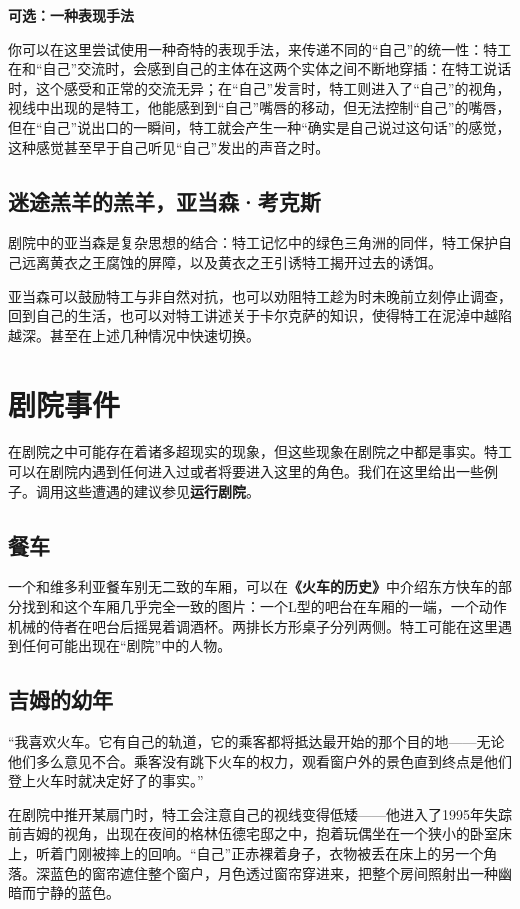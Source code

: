 \textbf{可选：一种表现手法}

你可以在这里尝试使用一种奇特的表现手法，来传递不同的“自己”的统一性：特工在和“自己”交流时，会感到自己的主体在这两个实体之间不断地穿插：在特工说话时，这个感受和正常的交流无异；在“自己”发言时，特工则进入了“自己”的视角，视线中出现的是特工，他能感到到“自己”嘴唇的移动，但无法控制“自己”的嘴唇，但在“自己”说出口的一瞬间，特工就会产生一种“确实是自己说过这句话”的感觉，这种感觉甚至早于自己听见“自己”发出的声音之时。

\subsection{迷途羔羊的羔羊，亚当森·考克斯}

剧院中的亚当森是复杂思想的结合：特工记忆中的绿色三角洲的同伴，特工保护自己远离黄衣之王腐蚀的屏障，以及黄衣之王引诱特工揭开过去的诱饵。

亚当森可以鼓励特工与非自然对抗，也可以劝阻特工趁为时未晚前立刻停止调查，回到自己的生活，也可以对特工讲述关于卡尔克萨的知识，使得特工在泥淖中越陷越深。甚至在上述几种情况中快速切换。

\section{剧院事件}
在剧院之中可能存在着诸多超现实的现象，但这些现象在剧院之中都是事实。特工可以在剧院内遇到任何进入过或者将要进入这里的角色。我们在这里给出一些例子。调用这些遭遇的建议参见\textbf{运行剧院}。

\subsection{餐车}
一个和维多利亚餐车别无二致的车厢，可以在\textbf{《火车的历史》}中介绍东方快车的部分找到和这个车厢几乎完全一致的图片：一个L型的吧台在车厢的一端，一个动作机械的侍者在吧台后摇晃着调酒杯。两排长方形桌子分列两侧。特工可能在这里遇到任何可能出现在“剧院”中的人物。

\subsection{吉姆的幼年}
“我喜欢火车。它有自己的轨道，它的乘客都将抵达最开始的那个目的地——无论他们多么意见不合。乘客没有跳下火车的权力，观看窗户外的景色直到终点是他们登上火车时就决定好了的事实。”

在剧院中推开某扇门时，特工会注意自己的视线变得低矮——他进入了1995年失踪前吉姆的视角，出现在夜间的格林伍德宅邸之中，抱着玩偶坐在一个狭小的卧室床上，听着门刚被摔上的回响。“自己”正赤裸着身子，衣物被丢在床上的另一个角落。深蓝色的窗帘遮住整个窗户，月色透过窗帘穿进来，把整个房间照射出一种幽暗而宁静的蓝色。

